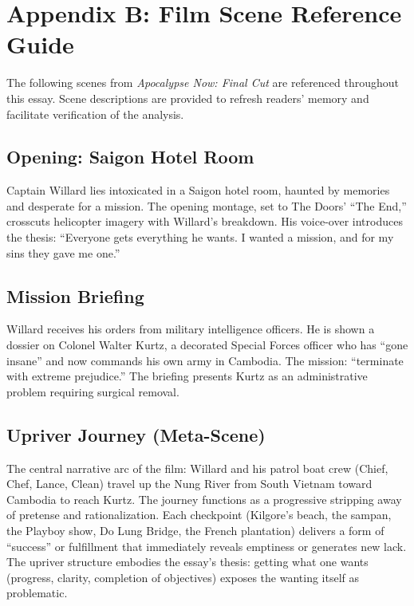 \section*{Appendix B: Film Scene Reference Guide}
\label{app:scene-reference}

The following scenes from \textit{Apocalypse Now: Final Cut} \parencite{CoppolaApocalypse2019}
are referenced throughout this essay. Scene descriptions are provided to refresh readers'
memory and facilitate verification of the analysis.

\pagebreak[0]
\subsection*{Opening: Saigon Hotel Room}
\label{scene:saigon-opening}

Captain Willard lies intoxicated in a Saigon hotel room, haunted by memories and desperate for
a mission. The opening montage, set to The Doors' ``The End,'' crosscuts helicopter imagery
with Willard's breakdown. His voice-over introduces the thesis: ``Everyone gets everything he
wants. I wanted a mission, and for my sins they gave me one.''

\pagebreak[0]
\subsection*{Mission Briefing}
\label{scene:briefing}

Willard receives his orders from military intelligence officers. He is shown a dossier on
Colonel Walter Kurtz, a decorated Special Forces officer who has ``gone insane'' and now
commands his own army in Cambodia. The mission: ``terminate with extreme prejudice.'' The
briefing presents Kurtz as an administrative problem requiring surgical removal.

\pagebreak[0]
\subsection*{Upriver Journey (Meta-Scene)}
\label{scene:upriver-journey}

The central narrative arc of the film: Willard and his patrol boat crew (Chief, Chef, Lance,
Clean) travel up the Nung River from South Vietnam toward Cambodia to reach Kurtz. The journey
functions as a progressive stripping away of pretense and rationalization. Each checkpoint
(Kilgore's beach, the sampan, the Playboy show, Do Lung Bridge, the French plantation)
delivers a form of ``success'' or fulfillment that immediately reveals emptiness or generates
new lack. The upriver structure embodies the essay's thesis: getting what one wants (progress,
clarity, completion of objectives) exposes the wanting itself as problematic.

